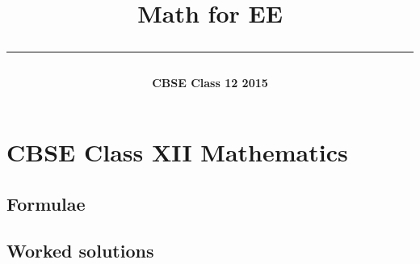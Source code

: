 \documentclass[journal]{IEEEtran}
\begin{document}

\onecolumn
\title{\begin{center}{\LARGE\bfseries Math for EE}\\\rule{0.4\columnwidth}{0.4pt}\end{center}}
\author{\vspace{11cm}\begin{center}{\fontsize{26}{31}\selectfont\bfseries CBSE Class 12 2015}\end{center}}
\maketitle
\thispagestyle{empty}
\newpage
\tableofcontents
\newpage

\section{CBSE Class XII Mathematics}
\subsection{Formulae}

\newpage
\subsection{Worked solutions}


\newpage
\end{document}
